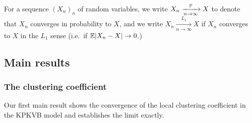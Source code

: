 For a sequence $(X_n)_n$ of random variables, we write $X_n \xrightarrow[n\to\infty]{\mathbb{P}} X$ to denote that $X_n$ converges in 
probability to $X$, and we write $X_n \xrightarrow[n\to\infty]{L_1} X$ if $X_n$ converges to $X$ in the $L_1$ sense 
(i.e.~if ${\mathbb E} |X_n-X| \to 0$.)



\subsection{Main results}\label{ssec:main_results}

\subsubsection{The clustering coefficient}

Our first main result shows the convergence of the local clustering coefficient in the KPKVB model and 
establishes the limit exactly.

